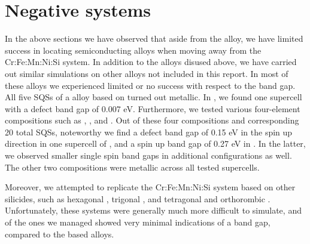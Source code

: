 \newpage
\section{Negative systems}

In the above sections we have observed that aside from the  alloy, we have limited success in locating semiconducting alloys when moving away from the Cr:Fe:Mn:Ni:Si system. In addition to the alloys disused above, we have carried out similar simulations on other alloys not included in this report. In most of these alloys we experienced limited or no success with respect to the band gap. All five SQSs of a  alloy based on  turned out metallic. In , we found one supercell with a defect band gap of 0.007 eV. Furthermore, we tested various four-element compositions such as , ,  and . Out of these four compositions and corresponding 20 total SQSs, noteworthy we find a defect band gap of 0.15 eV in the spin up direction in one supercell of , and a spin up band gap of 0.27 eV in . In the latter, we observed smaller single spin band gaps in additional configurations as well. The other two compositions were metallic across all tested supercells.    

Moreover, we attempted to replicate the Cr:Fe:Mn:Ni:Si system based on other silicides, such as hexagonal , trigonal , and tetragonal and orthorombic . Unfortunately, these systems were generally much more difficult to simulate, and of the ones we managed showed very minimal indications of a band gap, compared to the  based alloys. 
